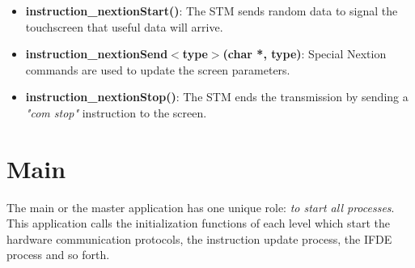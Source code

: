 \begin{itemize}
\item \textbf{instruction\_nextionStart()}: The STM sends random data to signal the touchscreen that useful data will arrive.
\item \textbf{instruction\_nextionSend$<$type$>$(char *, type)}: Special Nextion commands are used to update the screen parameters.
\item \textbf{instruction\_nextionStop()}: The STM ends the transmission by sending a \textit{"com stop"} instruction to the screen. 
\end{itemize}

\section{Main}
The main or the master application has one unique role: \textit{to start all processes}. This application calls the initialization functions of each level which start the hardware communication protocols, the instruction update process, the IFDE process and so forth. 